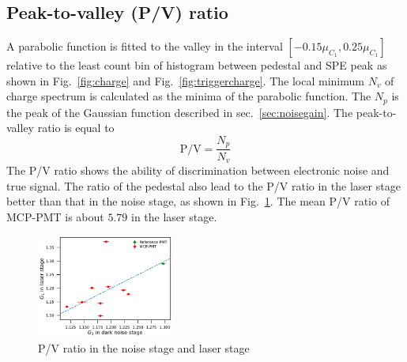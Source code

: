 \subsection{Peak-to-valley (P/V) ratio}
A parabolic function is fitted to the valley in the interval $[-0.15\mu_{C_1}, 0.25\mu_{C_1}]$ relative to the least count bin of histogram between pedestal and SPE peak as shown in Fig.~\ref{fig:charge} and Fig.~\ref{fig:triggercharge}. The local minimum $N_v$ of charge spectrum is calculated as the minima of the parabolic function. The $N_p$ is the peak of the Gaussian function described in sec.~\ref{sec:noisegain}. The peak-to-valley ratio is equal to  
\begin{equation}
    \mathrm{P/V}=\frac{N_p}{N_v}
\end{equation}
The P/V ratio shows the ability of discrimination between electronic noise and true signal. The ratio of the pedestal also lead to the P/V ratio in the laser stage better than that in the noise stage, as shown in Fig.~\ref{fig:PVCompare}. The mean P/V ratio of MCP-PMT is about $5.79$ in the laser stage.
\begin{figure}[!htbp]
    \centering
    \includegraphics[width=0.4\textwidth,page=6]{figures/result/compare.pdf}
    \caption{P/V ratio in the noise stage and laser stage} 
    \label{fig:PVCompare}
\end{figure}

